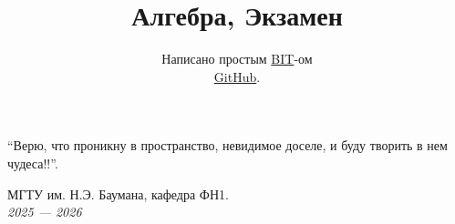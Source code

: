 \documentclass[a4papper]{article}
\title{\Huge Алгебра, Экзамен}
\author{
    Написано простым \href{https://t.me/Borislav_Timoshin}{BIT}-ом \\
    \href{https://github.com/BMSTU-BS1/Linear-Algebra-Exam}{GitHub}.
}
\date{} %
\begin{document}
    \pagestyle{fancy}
    \fancyhead[L]{\thepage}

    \maketitle

    \epigraph{
        ``Верю, что проникну в пространство, невидимое доселе, и буду творить в нем чудеса!!''.
    }{}


    \vfill %

    \begin{center}
        \Large МГТУ им. Н.Э. Баумана, кафедра ФН1. \\
        \emph{2025 — 2026}
    \end{center}

    \newpage
        
    \tableofcontents

    
    
    
    
    
    
    
    
    
    
    
    
    
    
    
    
    
    
    
    
    
    
    
    
    
    
    
\end{document}
